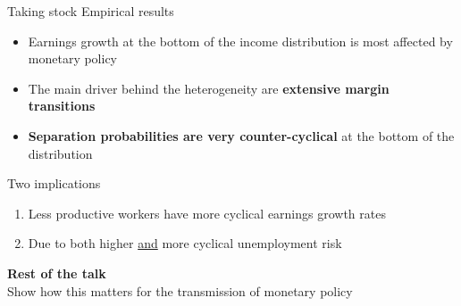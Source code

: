 \documentclass[10pt, aspectratio = 169]{beamer} %
\theoremstyle{mystyle}
\begin{document}
\begin{frame}{Taking stock}\label{stock}
\alert{Empirical results} \ \ \ \hyperlink{LRempl}{} \hyperlink{LRearn}{} \hyperlink{gini}{}
\begin{itemize}
    \item Earnings growth at the bottom of the income distribution is most affected by monetary policy
    \item The main driver behind the heterogeneity are \textbf{extensive margin transitions} 
    \item \textbf{Separation probabilities are very counter-cyclical} at the bottom of the distribution
\end{itemize}
\alert{Two implications}
\vspace{2pt}
\begin{enumerate}
    \item Less productive workers have more cyclical earnings growth rates
\item Due to both higher \underline{and} more cyclical unemployment risk
\end{enumerate}
\vspace{5pt}
\textbf{Rest of the talk}\\
\vspace{2pt}
\hspace{5pt} Show how this matters for the transmission of monetary policy
\end{frame}
\end{document}
